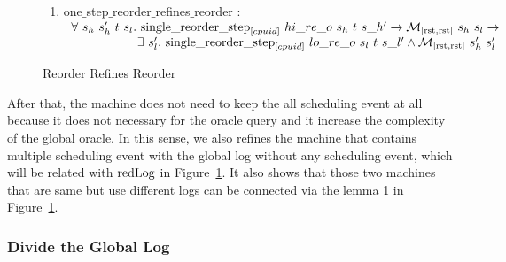 \begin{figure}
\noindent{}
\begin{enumerate}
\item one$\_$step$\_$reorder$\_$refines$\_$reorder : \\
$
\begin{array}{l}
\forall \ s_h \ s_h' \ t \ s_l . \ \singlereorderstep{cpuid}{hi\_re\_o}{s_h}{t}{s\_h'} \rightarrow \matchrrstaterrstae{s_h}{s_l} \rightarrow \\
\ \ \ \ \ \ \ \ \ \ \ \ \ \ \ \ \exists\ s_l' . \  \singlereorderstep{cpuid}{lo\_re\_o}{s_l}{t}{s\_l'} \wedge  \matchrrstaterrstae{s_h'}{s_l'}\\
\end{array}
$
\end{enumerate}
\caption{Reorder Refines Reorder}
\label{fig:chapter:conlink:reorder-refines-reorder}
\end{figure}
After that, 
the machine does not need to keep the 
all scheduling event at all because it does not necessary 
for the oracle query 
and it increase the complexity of the global oracle. 
In this sense, 
we also refines the machine 
that contains multiple scheduling event with the global log without any scheduling event,
which will be related with ${\mathrm{redLog}}$ in Figure~\ref{fig:chapter:conlink:reorder-refines-reorder}.
It also shows that those two machines
that are same but use different logs
can be connected via the lemma 1 in  Figure~\ref{fig:chapter:conlink:reorder-refines-reorder}.


\subsubsection{Divide the Global Log}

